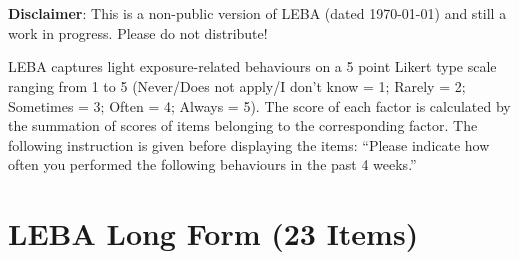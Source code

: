 \clearpage
\makeatletter
\efloat@restorefloats
\makeatother


\begin{appendix}
\section{}
\textbf{Disclaimer}: This is a non-public version of LEBA (dated \today)
and still a work in progress. Please do not distribute!

LEBA captures light exposure-related behaviours on a 5 point Likert type
scale ranging from 1 to 5 (Never/Does not apply/I don't know = 1; Rarely
= 2; Sometimes = 3; Often = 4; Always = 5). The score of each factor is
calculated by the summation of scores of items belonging to the
corresponding factor. The following instruction is given before
displaying the items: ``Please indicate how often you performed the
following behaviours in the past 4 weeks.''

\newpage

\blandscape

\hypertarget{leba-long-form-23-items}{%
\section{LEBA Long Form (23 Items)}\label{leba-long-form-23-items}}


\end{appendix}
